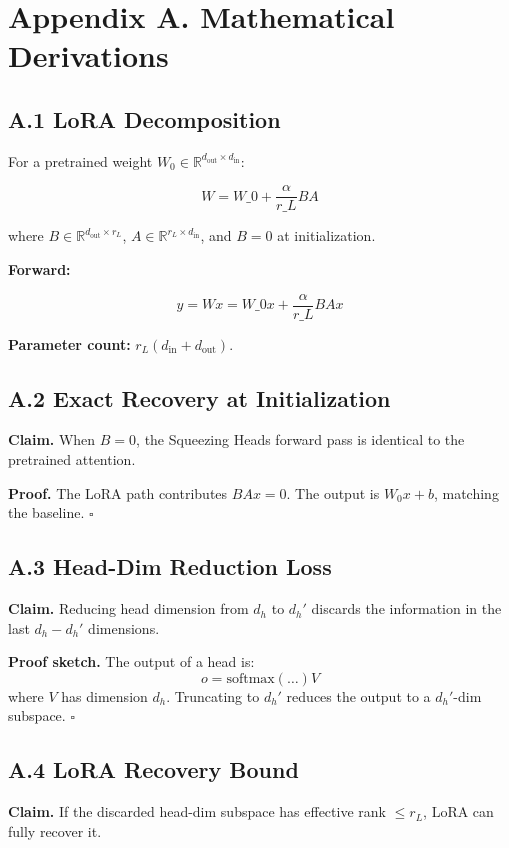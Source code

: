 
\section{Appendix A. Mathematical Derivations}

\subsection{A.1 LoRA Decomposition}

For a pretrained weight $W_0 \in \mathbb{R}^{d_\text{out} \times d_\text{in}}$:

\[
W = W\_0 + \frac{\alpha}{r\_L} B A
\]

where $B \in \mathbb{R}^{d_\text{out} \times r_L}$, $A \in \mathbb{R}^{r_L \times d_\text{in}}$, and $B = 0$ at initialization.

\textbf{Forward:}

\[
y = W x = W\_0 x + \frac{\alpha}{r\_L} B A x
\]

\textbf{Parameter count:} $r_L (d_\text{in} + d_\text{out})$.

\subsection{A.2 Exact Recovery at Initialization}

\textbf{Claim.} When $B = 0$, the Squeezing Heads forward pass is identical to 
the pretrained attention.

\textbf{Proof.} The LoRA path contributes $B A x = 0$. The output is $W_0 x + b$, 
matching the baseline. $\square$

\subsection{A.3 Head-Dim Reduction Loss}

\textbf{Claim.} Reducing head dimension from $d_h$ to $d_h'$ discards the 
information in the last $d_h - d_h'$ dimensions.

\textbf{Proof sketch.} The output of a head is:
\[
o = \text{softmax}(\ldots) V
\]
where $V$ has dimension $d_h$. Truncating to $d_h'$ reduces the output to 
a $d_h'$-dim subspace. $\square$

\subsection{A.4 LoRA Recovery Bound}

\textbf{Claim.} If the discarded head-dim subspace has effective rank $\leq r_L$, 
LoRA can fully recover it.


